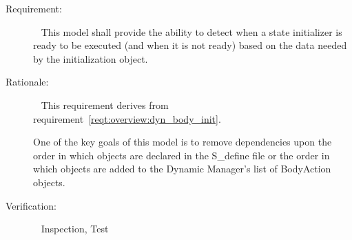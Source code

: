 \label{reqt:DynBodyInit:is_ready}
\begin{description}
  \item[Requirement:]\ \newline
    This model shall provide the ability to detect when a state
    initializer is ready to be executed (and when it is not ready)
    based on the data needed by the initialization object.
  \item[Rationale:]\ \newline
    This requirement derives from
    requirement~\ref{reqt:overview:dyn_body_init}.

    One of the key goals of this model is to remove dependencies upon the order
    in which objects are declared in the S\_define file or the order in which
    objects are added to the Dynamic Manager's list of BodyAction objects.
  \item[Verification:]\ \newline
    Inspection, Test
\end{description}
